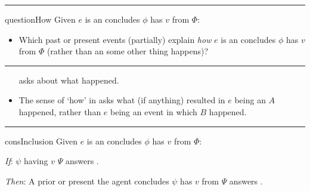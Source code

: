 \documentclass[10pt]{article}
\newcommand\lLine{{\color{lightgray} \noindent\rule{\textwidth}{0.4pt}}}
\newcommand\sepLine{
  \vfill
  \par\noindent\rule{\textwidth}{0.4pt}
  \vfill}
\newcommand{\hand}{\ding{43}}
\begin{document}
\sepLine

\begin{note}
  \begin{question}{questionHow}{\qHow{}}
    Given \(e\) is an  \vAgent{} concludes \prop{} \(\phi\) has \val{} \(v\) from \pool{} \(\Phi\):
    \begin{itemize}
    \item
      Which past or present events (partially) explain \emph{how} \(e\) is an  \vAgent{} concludes \prop{} \(\phi\) has \val{} \(v\) from \pool{} \(\Phi\) (rather than an  some other thing happens)?
    \end{itemize}
    \vspace{-1.5\baselineskip}
  \end{question}
\end{note}

\lLine

\begin{note}
  \begin{itemize}
  \item[\hand]
    \qHow{} asks about what happened.
  \end{itemize}

  \begin{itemize}
  \item
    The sense of `how' in \qHow{} asks what (if anything) resulted in \(e\) being an \eiw{} \(A\) happened, rather than \(e\) being an event in which \(B\) happened.
  \end{itemize}
\end{note}

\sepLine

\begin{note}
  \begin{constraint}{consInclusion}{\issueInclusion{}}
    Given \(e\) is an  \vAgent{} concludes \prop{} \(\phi\) has \val{} \(v\) from \pool{} \(\Phi\):
    \begin{itenum}
    \item[\emph{If}:]
       \(\psi\) having \val{} \(v\) \fingf{} \(\Psi\) answers \qWhy{}.
    \item[\emph{Then}:]
      A prior or present  the agent concludes \(\psi\) has \val{} \(v\) from \(\Psi\) answers \qHow{}.
    \end{itenum}
    \vspace{-\baselineskip}
  \end{constraint}
\end{note}
\end{document}
